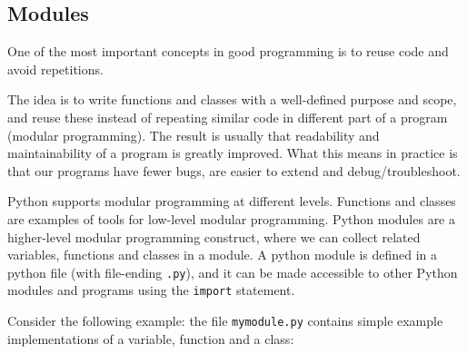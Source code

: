 \documentclass[11pt]{article}
\begin{document}
    \hypertarget{modules}{%
\subsection{Modules}\label{modules}}

    One of the most important concepts in good programming is to reuse code
and avoid repetitions.

The idea is to write functions and classes with a well-defined purpose
and scope, and reuse these instead of repeating similar code in
different part of a program (modular programming). The result is usually
that readability and maintainability of a program is greatly improved.
What this means in practice is that our programs have fewer bugs, are
easier to extend and debug/troubleshoot.

Python supports modular programming at different levels. Functions and
classes are examples of tools for low-level modular programming. Python
modules are a higher-level modular programming construct, where we can
collect related variables, functions and classes in a module. A python
module is defined in a python file (with file-ending \texttt{.py}), and
it can be made accessible to other Python modules and programs using the
\texttt{import} statement.

Consider the following example: the file \texttt{mymodule.py} contains
simple example implementations of a variable, function and a class:
\end{document}
